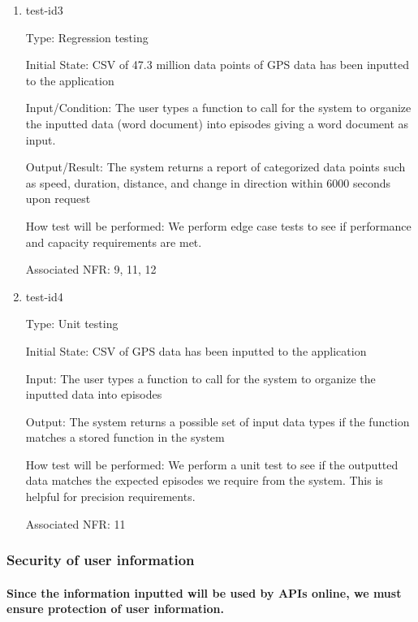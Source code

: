 \documentclass[12pt, titlepage]{article}
\begin{document}
\begin{enumerate}

\item{test-id3\\}

Type: Regression testing
					
Initial State: CSV of 47.3 million data points of GPS data has been inputted to the application
					
Input/Condition: The user types a function to call for the system to organize the
inputted data (word document) into episodes giving a word document as input. 
					
Output/Result: The system returns a report of categorized data points such
as speed, duration, distance, and change in direction within 6000 seconds upon request
					
How test will be performed: We perform edge case tests to see if performance and capacity requirements are met. 

Associated NFR: 9, 11, 12

\item{test-id4\\}

Type: Unit testing
					
Initial State: CSV of GPS data has been inputted to the application
					
Input: The user types a function to call for the system to organize the
inputted data into episodes
					
Output: The system returns a possible set of input data types if the function matches a stored function in the system
					
How test will be performed: We perform a unit test to see if the outputted data matches the expected episodes we require from the system. This is helpful for precision requirements.

Associated NFR: 11

\end{enumerate}


\subsubsection{Security of user information}
		
\paragraph{Since the information inputted will be used by APIs online, we must ensure protection of user information.}
\end{document}
